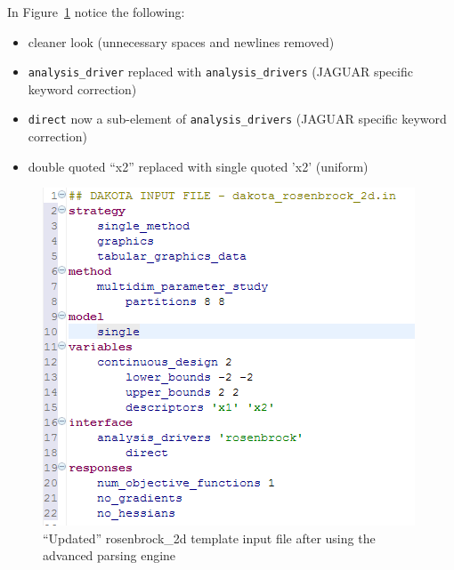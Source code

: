 In Figure~\ref{fig:input:3fixed} notice the following:
\begin{itemize}
\item cleaner look (unnecessary spaces and newlines removed)
\item \texttt{analysis\_driver} replaced with \texttt{analysis\_drivers} (JAGUAR specific keyword correction)
\item \texttt{direct} now a sub-element of \texttt{analysis\_drivers} (JAGUAR specific keyword correction)
\item double quoted ``x2'' replaced with single quoted 'x2' (uniform)
\end{itemize}
\begin{figure}[htbp]
  \centering
  \includegraphics[scale=0.6]{images/3fixed}
  \caption{``Updated'' rosenbrock\_2d template input file after using the advanced parsing engine}
  \label{fig:input:3fixed}
\end{figure}      


